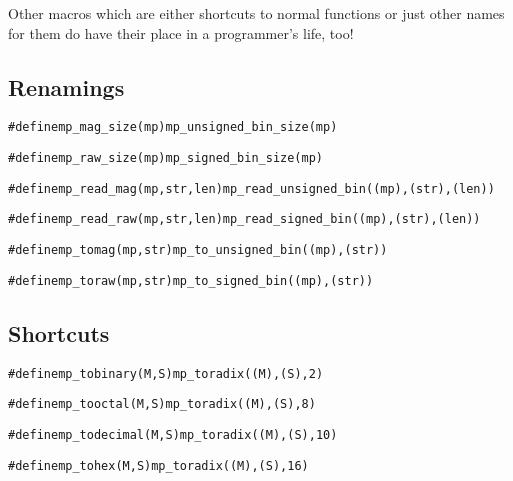 \documentclass[synpaper]{book}
\begin{document}
Other macros which are either shortcuts to normal functions or just other names for them do have their place in a programmer's life, too!

\subsection{Renamings}
\begin{alltt}
#define mp_mag_size(mp) mp_unsigned_bin_size(mp)
\end{alltt}


\begin{alltt}
#define mp_raw_size(mp) mp_signed_bin_size(mp)
\end{alltt}


\begin{alltt}
#define mp_read_mag(mp, str, len) mp_read_unsigned_bin((mp), (str), (len))
\end{alltt}


\begin{alltt}
 #define mp_read_raw(mp, str, len) mp_read_signed_bin((mp), (str), (len))
\end{alltt}


\begin{alltt}
#define mp_tomag(mp, str) mp_to_unsigned_bin((mp), (str))
\end{alltt}


\begin{alltt}
#define mp_toraw(mp, str)         mp_to_signed_bin((mp), (str))
\end{alltt}



\subsection{Shortcuts}

\begin{alltt}
#define mp_tobinary(M, S) mp_toradix((M), (S), 2)
\end{alltt}


\begin{alltt}
#define mp_tooctal(M, S) mp_toradix((M), (S), 8)
\end{alltt}


\begin{alltt}
#define mp_todecimal(M, S) mp_toradix((M), (S), 10)
\end{alltt}


\begin{alltt}
#define mp_tohex(M, S)     mp_toradix((M), (S), 16)
\end{alltt}



\end{document}
